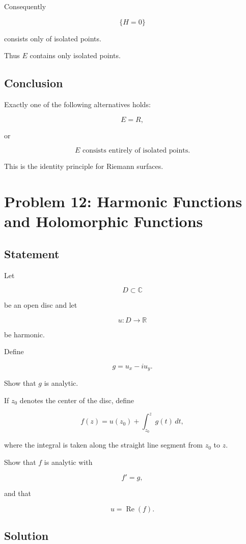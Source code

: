 \documentclass[12pt,a4paper]{article}
\theoremstyle{notespace}
\begin{document}
Consequently

\[
\{H=0\}
\]

consists only of isolated points.

Thus \(E\) contains only isolated points.

\subsection*{Conclusion}

Exactly one of the following alternatives holds:

\[
\boxed{
	E=R,
}
\]

or

\[
\boxed{
	E
	\text{ consists entirely of isolated points.}
}
\]

This is the identity principle for Riemann surfaces.

\bigskip

\section{Problem 12: Harmonic Functions and Holomorphic Functions}

\subsection*{Statement}

Let

\[
D\subset\mathbb C
\]

be an open disc and let

\[
u:D\to\mathbb R
\]

be harmonic.

Define

\[
g=u_x-i u_y.
\]

Show that \(g\) is analytic.

If \(z_0\) denotes the center of the disc, define

\[
f(z)
=
u(z_0)
+
\int_{z_0}^{z}
g(t)\,dt,
\]

where the integral is taken along the straight line segment from \(z_0\) to \(z\).

Show that \(f\) is analytic with

\[
f'=g,
\]

and that

\[
u=\operatorname{Re}(f).
\]

\subsection*{Solution}
\end{document}
